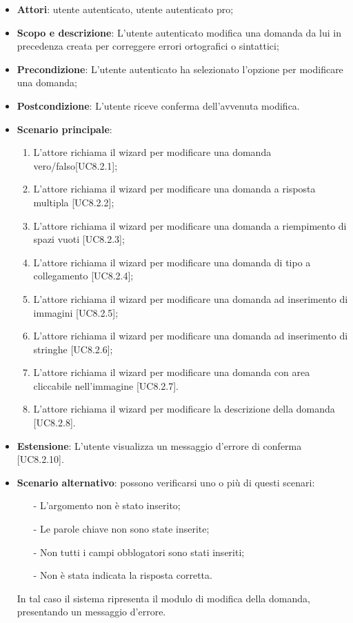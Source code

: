 	\begin{itemize}
		\item
			\textbf{Attori}: utente autenticato, utente autenticato pro;
		\item		
			\textbf{Scopo e descrizione}: L'utente autenticato modifica una domanda da lui in precedenza creata per correggere errori ortografici o sintattici;
		\item
			\textbf{Precondizione}: L'utente autenticato ha selezionato l'opzione per modificare una domanda;
		\item
			\textbf{Postcondizione}: L'utente riceve conferma dell'avvenuta modifica.
		\item
			\textbf{Scenario principale}:
	       		\begin{enumerate}
					\item
					L'attore richiama il wizard per modificare una domanda vero/falso[UC8.2.1];
					\item
					L'attore richiama il wizard per modificare una domanda a risposta multipla [UC8.2.2];
					\item
					L'attore richiama il wizard per modificare una domanda a riempimento di spazi vuoti [UC8.2.3];
					\item
					L'attore richiama il wizard per modificare una domanda di tipo a collegamento [UC8.2.4];
					\item
					L'attore richiama il wizard per modificare una domanda ad inserimento di immagini [UC8.2.5];
					\item
					L'attore richiama il wizard per modificare una domanda ad inserimento di stringhe [UC8.2.6];
					\item
					L'attore richiama il wizard per modificare una domanda con area cliccabile nell'immagine [UC8.2.7].
					\item
					L'attore richiama il wizard per modificare la descrizione della domanda [UC8.2.8].
	 			\end{enumerate}
	 	\item
			\textbf{Estensione}: L'utente visualizza un messaggio d'errore di conferma [UC8.2.10].
	 	\item
	 		\textbf{Scenario alternativo}: possono verificarsi uno o più di questi scenari:
				\begin{itemize}
					\item[-] 	
						L'argomento non è stato inserito;
					\item[-] 
						Le parole chiave non sono state inserite;
					\item[-] 
						Non tutti i campi obblogatori sono stati inseriti; 
					\item[-]
						Non è stata indicata la risposta corretta.	
				\end{itemize}
			In tal caso il sistema ripresenta il modulo di modifica della domanda, presentando un messaggio d'errore.
	\end{itemize}

